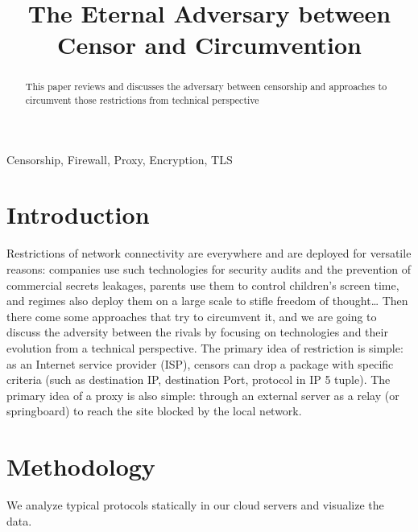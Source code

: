 \documentclass[conference]{IEEEtran}
\begin{document}
\title{The Eternal Adversary between Censor and Circumvention}
\footnotesize

\author{
}
\maketitle

\begin{abstract}
This paper reviews and discusses the adversary between censorship and approaches to circumvent those restrictions from technical perspective
\end{abstract}

\begin{IEEEkeywords}
Censorship, Firewall, Proxy, Encryption, TLS
\end{IEEEkeywords}

\section{Introduction}
Restrictions of network connectivity are everywhere and are deployed for versatile reasons: companies use such technologies for security audits and the prevention of commercial secrets leakages, parents use them to control children's screen time, and regimes also deploy them on a large scale to stifle freedom of thought… Then there come some approaches that try to circumvent it, and we are going to discuss the adversity between the rivals by focusing on technologies and their evolution from a technical perspective.
The primary idea of restriction is simple: as an Internet service provider (ISP), censors can drop a package with specific criteria (such as destination IP, destination Port, protocol in IP 5 tuple).
The primary idea of a proxy is also simple: through an external server as a relay (or springboard) to reach the site blocked by the local network.

\section{Methodology}
We analyze typical protocols statically in our cloud servers and visualize the data.
\end{document}
